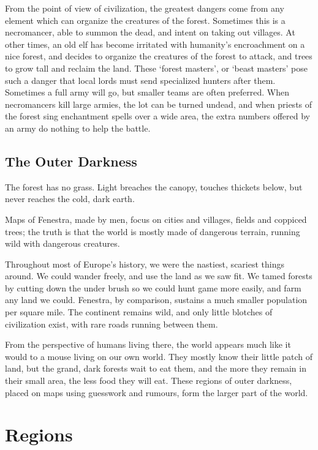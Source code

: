 \begin{multicols}{2}
From the point of view of civilization, the greatest dangers come from any element which can organize the creatures of the forest.
Sometimes this is a necromancer, able to summon the dead, and intent on taking out villages.
At other times, an old elf has become irritated with humanity's encroachment on a nice forest, and decides to organize the creatures of the forest to attack, and trees to grow tall and reclaim the land.
These `forest masters', or `beast masters' pose such a danger that local lords must send specialized hunters after them.
Sometimes a full army will go, but smaller teams are often preferred.
When necromancers kill large armies, the lot can be turned undead, and when priests of the forest sing enchantment spells over a wide area, the extra numbers offered by an army do nothing to help the battle.

\subsection{The Outer Darkness}

The forest has no grass.
Light breaches the canopy, touches thickets below, but never reaches the cold, dark earth.

Maps of Fenestra, made by men, focus on cities and villages, fields and coppiced trees; the truth is that the world is mostly made of dangerous terrain, running wild with dangerous creatures.

Throughout most of Europe's history, we were the nastiest, scariest things around.
We could wander freely, and use the land as we saw fit.
We tamed forests by cutting down the under brush so we could hunt game more easily, and farm any land we could.
Fenestra, by comparison, sustains a much smaller population per square mile.
The continent remains wild, and only little blotches of civilization exist, with rare roads running between them.

From the perspective of humans living there, the world appears much like it would to a mouse living on our own world.
They mostly know their little patch of land, but the grand, dark forests wait to eat them, and the more they remain in their small area, the less food they will eat.
These regions of outer darkness, placed on maps using guesswork and rumours, form the larger part of the world.

\end{multicols}

\section{Regions}
\label{regionEncounters}

